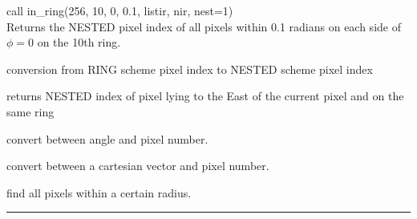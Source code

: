 \begin{example}
{
call in\_ring(256, 10, 0, 0.1, listir, nir, nest=1)  \\
}
{
Returns the NESTED pixel index of all pixels within 0.1 radians on each side of $\phi=0$ on the 10th ring.
}
\end{example}

\newpage
\begin{modules}
  \begin{sulist}{} %
 \item[\htmlref{ring2nest}{sub:pix_tools}] conversion from RING scheme pixel index to NESTED scheme pixel index
 \item[next\_in\_line\_nest] returns NESTED index of pixel lying to the East of the
 current pixel and on the same ring
  \end{sulist}
\end{modules}

\begin{related}
  \begin{sulist}{} %
  \item[\htmlref{pix2ang}{sub:pix_tools}, \htmlref{ang2pix}{sub:pix_tools}] convert between angle and pixel number.
  \item[\htmlref{pix2vec}{sub:pix_tools}, \htmlref{vec2pix}{sub:pix_tools}] convert between a cartesian vector and pixel number.
  \item[\htmlref{getdisc\_ring}{sub:getdisc_ring}] find all pixels within a certain radius.
  \end{sulist}
\end{related}

\rule{\hsize}{2mm}

\newpage
